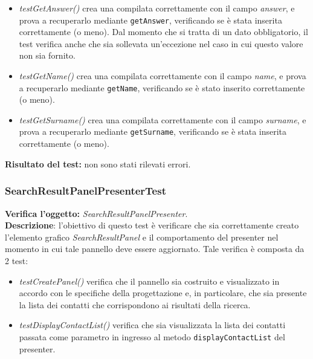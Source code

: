 \begin{itemize}
\item \textit{testGetAnswer() } crea una  compilata correttamente con il campo \textit{answer}, e prova a recuperarlo mediante \texttt{getAnswer}, verificando se è stata inserita correttamente (o meno). Dal momento che si tratta di un dato obbligatorio, il test verifica anche che sia sollevata un'eccezione nel caso in cui questo valore non sia fornito.
\item \textit{testGetName() }  crea una  compilata correttamente con il campo \textit{name}, e prova a recuperarlo mediante \texttt{getName}, verificando se è stato inserito correttamente (o meno).
\item \textit{testGetSurname() }  crea una  compilata correttamente con il campo \textit{surname}, e prova a recuperarlo mediante \texttt{getSurname}, verificando se è stata inserita correttamente (o meno).

\end{itemize}
\textbf{Risultato del test:} non sono stati rilevati errori.

\subsubsection{SearchResultPanelPresenterTest}
\textbf{Verifica l'oggetto:} \textit{SearchResultPanelPresenter}.\\
\textbf{Descrizione}: l'obiettivo di questo test è verificare che sia correttamente creato l'elemento grafico \textit{SearchResultPanel} e il comportamento del presenter nel momento in cui tale pannello deve essere aggiornato. Tale verifica è composta da 2 test:
\begin{itemize}
\item \textit{testCreatePanel() } verifica che il pannello sia costruito e visualizzato in accordo con le specifiche della progettazione e, in particolare, che sia presente la lista dei contatti che corrispondono ai risultati della ricerca.
\item \textit{testDisplayContactList()} verifica che sia visualizzata la lista dei contatti passata come parametro in ingresso al metodo \texttt{displayContactList} del presenter.
\end{itemize}

